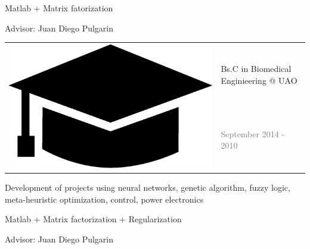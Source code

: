\documentclass[letterpaper]{article}
\begin{document}
\begin{minipage}{1.\linewidth}
\begin{minipage}{0.47\linewidth}
\begin{minipage}{1\linewidth}
{		Matlab + Matrix fatorization
		
		\textmd{Advisor:} Juan Diego Pulgarin}
	\end{minipage} %
	\begin{minipage}{1\linewidth} %
		\vspace{2ex}
		\begin{tabularx}{1\textwidth}{rX}				
			\multirow{2}{*}{\includegraphics[trim= 0.1cm 0.1cm 0.1cm 0.1cm, 
			clip=true, width=0.12\linewidth]{hat.eps}} & {\large Bs.C in 
			Biomedical Enginieering @ UAO}\\
			& {\small\textcolor{gray}{September 2014 - 2010}}
		\end{tabularx}
		\vspace{0.1ex}
		
		{\small Development of projects using neural networks, genetic 
		algorithm, fuzzy logic, meta-heuristic optimization, control, power 
		electronics
				
		Matlab + Matrix factorization + Regularization
		
		\textmd{Advisor:} Juan Diego Pulgarin}\\
	\end{minipage} %
	\begin{minipage}{1\linewidth}
		\vspace{2ex}
	\end{minipage}
\end{minipage}
\end{minipage}
\end{document}
